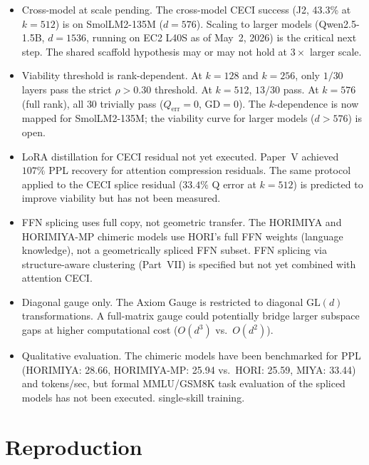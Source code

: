 \documentclass[11pt]{article}
\begin{document}
\begin{itemize}
\item Cross-model at scale pending. The cross-model CECI success
 (J2, 43.3\% at $k{=}512$) is on SmolLM2-135M ($d{=}576$). Scaling
 to larger models (Qwen2.5-1.5B, $d{=}1536$, running on EC2 L40S as
 of May~2, 2026) is the critical next step. The shared scaffold
 hypothesis may or may not hold at $3\times$ larger scale.

\item Viability threshold is rank-dependent. At $k{=}128$ and
 $k{=}256$, only $1/30$ layers pass the strict $\rho{>}0.30$ threshold.
 At $k{=}512$, $13/30$ pass. At $k{=}576$ (full rank), all $30$
 trivially pass ($Q_{\text{err}}{=}0$, GD${=}0$). The $k$-dependence
 is now mapped for SmolLM2-135M; the viability curve for larger models
 ($d{>}576$) is open.

\item LoRA distillation for CECI residual not yet executed.
 Paper~V achieved $107\%$ PPL recovery for attention compression
 residuals. The same protocol applied to the CECI splice residual
 ($33.4\%$ Q error at $k{=}512$) is predicted to improve viability but
 has not been measured.

\item FFN splicing uses full copy, not geometric transfer. The
 HORIMIYA and HORIMIYA-MP chimeric models use HORI's full FFN weights
 (language knowledge), not a geometrically spliced FFN subset. FFN
 splicing via structure-aware clustering (Part~VII) is specified but
 not yet combined with attention CECI.

\item Diagonal gauge only. The Axiom Gauge is restricted to
 diagonal $\mathrm{GL}(d)$ transformations. A full-matrix gauge
 could potentially bridge larger subspace gaps at higher
 computational cost ($O(d^3)$ vs.\ $O(d^2)$).

\item Qualitative evaluation. The chimeric models have been
 benchmarked for PPL (HORIMIYA: 28.66, HORIMIYA-MP: 25.94 vs.\
 HORI: 25.59, MIYA: 33.44) and tokens/sec, but formal MMLU/GSM8K
 task evaluation of the spliced models has not been executed.
 single-skill training.
\end{itemize}

\section{Reproduction}
\label{sec:repro}
\end{document}
